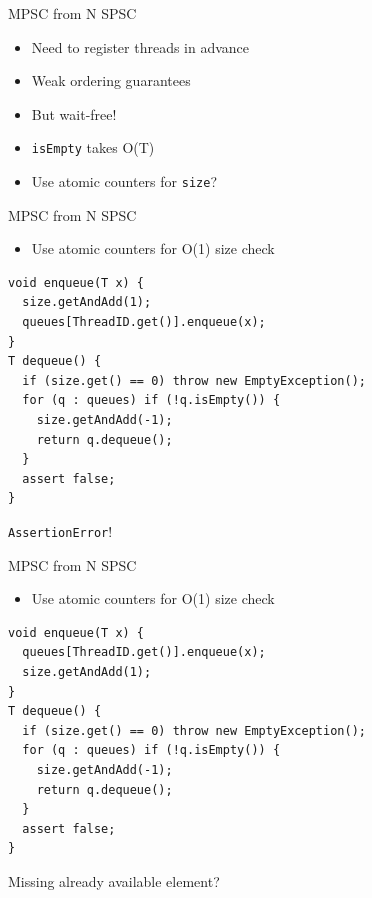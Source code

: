 \begin{frame}[t,fragile]{MPSC from N SPSC}

\begin{itemize}
  \item Need to register threads in advance
  \pause \item Weak ordering guarantees
  \pause \item But wait-free!
  \pause \item \texttt{isEmpty} takes O(T)
  \pause \item Use atomic counters for \texttt{size}?
\end{itemize}
\end{frame}

\begin{frame}[t,fragile]{MPSC from N SPSC}

\begin{itemize}
  \item Use atomic counters for O(1) size check
\end{itemize}

\pause

\begin{verbatim}
void enqueue(T x) {  
  size.getAndAdd(1);
  queues[ThreadID.get()].enqueue(x);
}
T dequeue() {
  if (size.get() == 0) throw new EmptyException();
  for (q : queues) if (!q.isEmpty()) {
    size.getAndAdd(-1);
    return q.dequeue();
  }
  assert false;
}
\end{verbatim}

\pause
\texttt{AssertionError}!
\end{frame}


\begin{frame}[t,fragile]{MPSC from N SPSC}

\begin{itemize}
  \item Use atomic counters for O(1) size check
\end{itemize}

\begin{verbatim}
void enqueue(T x) {
  queues[ThreadID.get()].enqueue(x);
  size.getAndAdd(1);
}
T dequeue() {
  if (size.get() == 0) throw new EmptyException();
  for (q : queues) if (!q.isEmpty()) {
    size.getAndAdd(-1);
    return q.dequeue();
  }
  assert false;
}
\end{verbatim}

\pause
Missing already available element?

\end{frame}


